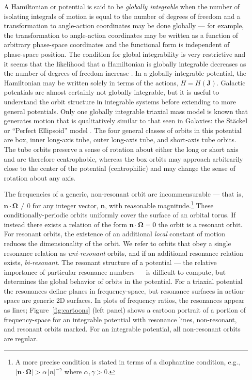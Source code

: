 \documentclass[letterpaper,12pt,preprint]{aastex}
\newcommand{\bs}[1]{\boldsymbol{#1}}
\begin{document}
A Hamiltonian or potential is said to be \emph{globally integrable} when the number of isolating integrals of motion is equal to the number of degrees of freedom and a transformation to angle-action coordinates may be done globally --- for example, the transformation to angle-action coordinates may be written as a function of arbitrary phase-space coordinates and the functional form is independent of phase-space position. The condition for global integrability is very restrictive and it seems that the likelihood that a Hamiltonian is globally integrable decreases as the number of degrees of freedom increase \citep[e.g.,][]{lichtenberg83}. In a globally integrable potential, the Hamiltonian may be written solely in terms of the actions, $H = H(\boldsymbol{J})$. Galactic potentials are almost certainly not globally integrable, but it is useful to understand the orbit structure in integrable systems before extending to more general potentials. Only one globally integrable triaxial mass model is known that generates motion that is qualitatively similar to that seen in Galaxies: the St\"ackel or ``Perfect Ellipsoid'' model \citep[e.g.,][]{kuzmin73, deZeeuw85}. The four general classes of orbits in this potential are box, inner long-axis tube, outer long-axis tube, and short-axis tube orbits. The tube orbits preserve a sense of rotation about either the long or short axis and are therefore centrophobic, whereas the box orbits may approach arbitrarily close to the center of the potential (centrophilic) and may change the sense of rotation about any axis.

The frequencies of a generic, non-resonant orbit are incommensurable --- that is, $\bs{n} \cdot \bs{\Omega} \neq 0$ for any integer vector, $\bs{n}$, with reasonable magnitude.\footnote{A more precise condition is stated in terms of a diophantine condition, e.g., $|\bs{n} \cdot \boldsymbol{\Omega}| > \alpha \, |n|^{-\gamma}$ where $\alpha, \gamma>0$.} These conditionally-periodic orbits uniformly cover the surface of an orbital torus. If instead there exists a relation of the form $\boldsymbol{n} \cdot \boldsymbol{\Omega} = 0$ the orbit is a resonant orbit. For resonant orbits, the existence of an additional \emph{local} constant of motion reduces the dimensionality of the orbit. We refer to orbits that obey a single resonance relation as \emph{uni-resonant} orbits, and if an additional resonance relation exists, \emph{bi-resonant}. The resonant structure of a potential --- the relative importance of particular resonance numbers --- is difficult to compute, but determines the global behavior of orbits in the potential. For a triaxial potential the resonances define planes in frequency-space, but resonance surfaces in action-space are generic 2D surfaces. In plots of frequency ratios, the resonances appear as lines; Figure~\ref{fig:cartoons} (left panel) shows a cartoon portrait of a portion of frequency-space for an integrable potential with resonance lines, non-resonant, and resonant orbits marked. For an integrable potential, all non-resonant orbits are regular.
\end{document}
